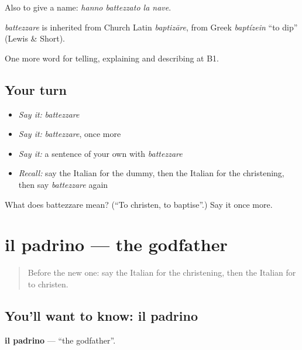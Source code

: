 Also to give a name: \emph{hanno battezzato la nave}.

\begin{cousinweb}
\emph{battezzare} is inherited from Church Latin \emph{baptizāre}, from Greek \emph{baptízein} \textquotedblleft{}to dip\textquotedblright{} (Lewis \& Short).
\end{cousinweb}

\begin{grammarlens}[title={What you've built}]
One more word for telling, explaining and describing at B1.
\end{grammarlens}

\subsection*{Your turn}
\begin{itemize}
\raggedright
  \item \emph{Say it:} \emph{battezzare}
  \item \emph{Say it:} \emph{battezzare}, once more
  \item \emph{Say it:} a sentence of your own with \emph{battezzare}
  \item \emph{Recall:} say the Italian for the dummy, then the Italian for the christening, then say \emph{battezzare} again
\end{itemize}

\begin{tcolorbox}[breakable,colback=teal!4,colframe=teal!35!black,title={Before you move on}]
What does battezzare mean? (\textquotedblleft{}To christen, to baptise\textquotedblright{}.) Say it once more.
\end{tcolorbox}
\section[il padrino]{il padrino — the godfather}

\label{lesson:IT-C308-padrino}



\begin{quote}
Before the new one: say the Italian for the christening, then the Italian for to christen.
\end{quote}

\subsection*{You'll want to know: il padrino}
\textbf{il padrino} — \textquotedblleft{}the godfather\textquotedblright{}.

